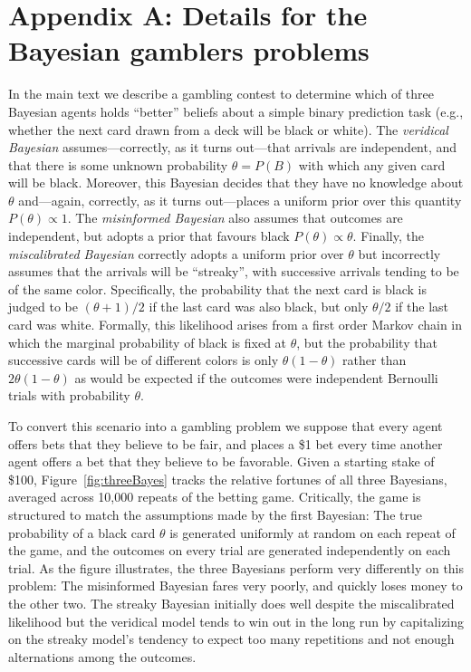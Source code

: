 
\section*{Appendix A: Details for the Bayesian gamblers problems}

In the main text we describe a gambling contest to determine which of three Bayesian agents holds ``better'' beliefs about a simple binary prediction task (e.g., whether the next card drawn from a deck will be black or white). The {\it veridical Bayesian} assumes---correctly, as it turns out---that arrivals are independent, and that there is some unknown probability $\theta = P(B)$ with which any given card will be black. Moreover, this Bayesian decides that they have no knowledge about $\theta$ and---again, correctly, as it turns out---places a uniform prior over this quantity $P(\theta) \propto 1$. The {\it misinformed Bayesian} also assumes that outcomes are independent, but adopts a prior that favours black  $P(\theta) \propto \theta$. Finally, the {\it miscalibrated Bayesian} correctly adopts a uniform prior over $\theta$ but incorrectly assumes that the arrivals will be ``streaky'', with successive arrivals tending to be of the same color. Specifically, the probability that the next card is black is judged to be $(\theta+1)/2$ if the last card was also black, but only $\theta/2$ if the last card was white. Formally, this likelihood arises from a first order Markov chain in which the marginal probability of black is fixed at $\theta$, but the probability that successive cards will be of different colors is only $\theta(1-\theta)$ rather than $2\theta(1-\theta)$ as would be expected if the outcomes were independent Bernoulli trials with probability $\theta$.

To convert this scenario into a gambling problem we suppose that every agent offers bets that they believe to be fair, and places a \$1 bet every time another agent offers a bet that they believe to be favorable. Given a starting stake of \$100, Figure~\ref{fig:threeBayes} tracks the relative fortunes of all three Bayesians, averaged across 10,000 repeats of the betting game. Critically, the game is structured to match the assumptions made by the first Bayesian: The true probability of a black card $\theta$ is generated uniformly at random on each repeat of the game, and the outcomes on every trial are generated independently on each trial. As the figure illustrates, the three Bayesians perform very differently on this problem: The misinformed Bayesian fares very poorly, and quickly loses money to the other two. The streaky Bayesian initially does well despite the miscalibrated likelihood but the veridical model tends to win out in the long run by capitalizing on the streaky model's tendency to expect too many repetitions and not enough alternations among the outcomes.  

